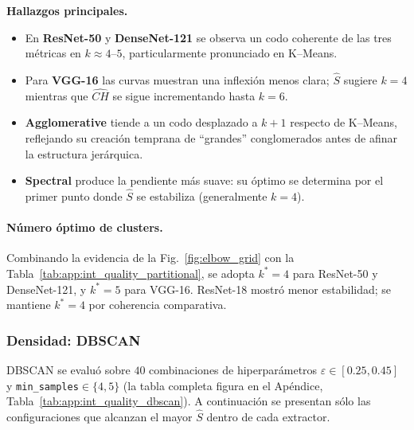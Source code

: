 \vspace{1ex}
\noindent\textbf{Hallazgos principales.}
\begin{itemize}
  \item En \textbf{ResNet-50} y \textbf{DenseNet-121} se observa un codo
        coherente de las tres métricas en \(k\approx4\)–\(5\),
        particularmente pronunciado en K–Means.
  \item Para \textbf{VGG-16} las curvas muestran una inflexión menos clara;
        \(\widehat S\) sugiere \(k=4\) mientras que \(\widehat{CH}\) se sigue
        incrementando hasta \(k=6\).
  \item \textbf{Agglomerative} tiende a un codo desplazado a
        \(k+1\) respecto de K–Means, reflejando su creación temprana de
        “grandes” conglomerados antes de afinar la estructura jerárquica.
  \item \textbf{Spectral} produce la pendiente más suave: su óptimo se
        determina por el primer punto donde
        \(\widehat S\) se estabiliza (generalmente \(k=4\)).
\end{itemize}

\vspace{1ex}
\paragraph{Número óptimo de clusters.}
Combinando la evidencia de la Fig.~\ref{fig:elbow_grid} con
la Tabla~\ref{tab:app:int_quality_partitional}, se adopta \(k^\ast=4\) para
ResNet-50 y DenseNet-121, y \(k^\ast=5\) para VGG-16.
ResNet-18 mostró menor estabilidad; se mantiene \(k^\ast=4\) por coherencia
comparativa.

\subsubsection{Densidad: DBSCAN}

DBSCAN se evaluó sobre \(40\) combinaciones de hiperparámetros
\(\varepsilon\in[0.25,0.45]\) y \texttt{min\_samples}\(\in\{4,5\}\)
(la tabla completa figura en el
Apéndice, Tabla~\ref{tab:app:int_quality_dbscan}).
A continuación se presentan sólo las configuraciones que
alcanzan el mayor \(\widehat S\) dentro de cada extractor.

